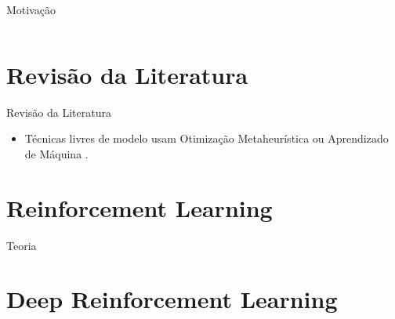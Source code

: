 \documentclass{beamer}
\begin{document}
\begin{frame}{Motivação}
\begin{columns}[T] %
\begin{column}{.5\textwidth}
\end{column}
\begin{column}{.5\textwidth}
\end{column}
\end{columns}
\end{frame}

\section{Revisão da Literatura}

\begin{frame}{Revisão da Literatura}
\begin{itemize}
\item Técnicas livres de modelo usam Otimização Metaheurística ou Aprendizado de Máquina \parencite{2017-TOG-deepLoco}.
\end{itemize}
\end{frame}

\section{Reinforcement Learning}

\begin{frame}{Teoria}
\end{frame}

\section{Deep Reinforcement Learning}
\end{document}
